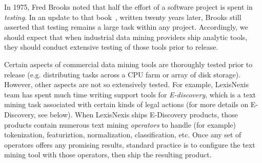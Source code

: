 \documentclass{sig-alternate-05-2015}
\begin{document}
In 1975, Fred Brooks noted that half the effort 
of a software project is spent in {\em testing}. In an update
to that book~\cite{Brooks95}, written twenty years later, Brooks still
asserted that testing remains a large task within any project.
Accordingly, we should expect that when industrial data mining
providers ship analytic tools, they should conduct extensive
testing of those tools prior to release.

Certain aspects of commercial data mining tools are thoroughly tested prior to
release (e.g. distributing tasks across
a CPU farm or array of disk storage). However, other aspects
are not so extensively tested. For example, 
LexisNexis team has
spent much time writing support tools for {\em E-discovery}, 
which is a text mining task associated with certain kinds of
legal actions (for more details on E-Discovery, see below).
When LexisNexis ships E-Discovery products, those products contain
numerous text mining {\em operators} to handle (for example)
tokenization, featuriztion, normalization, classification, etc. 
Once any set of operators offers any promising results,
standard practice is to configure the text mining tool
with those operators, then ship the resulting product.
\end{document}
